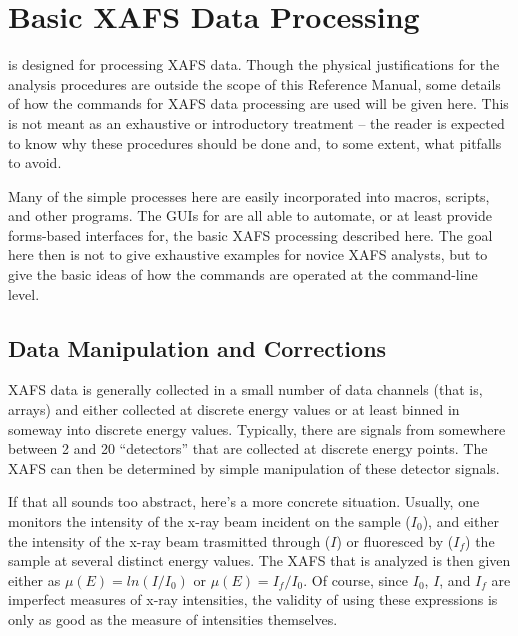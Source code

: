 \section{Basic XAFS Data Processing} \label{Ch:XAFSProcess}

{\ifeffit} is designed for processing XAFS data.  Though the physical
justifications for the analysis procedures are outside the scope of this
Reference Manual, some details of how the commands for XAFS data processing
are used will be given here.  This is not meant as an exhaustive or
introductory treatment -- the reader is expected to know why these
procedures should be done and, to some extent, what pitfalls to avoid.

Many of the simple processes here are easily incorporated into macros,
scripts, and other programs.  The GUIs for {\ifeffit} are all able to
automate, or at least provide forms-based interfaces for, the basic XAFS
processing described here.  The goal here then is not to give exhaustive
examples for novice XAFS analysts, but to give the basic ideas of how the
commands are operated at the command-line level.

\subsection{Data Manipulation and Corrections} \label{Ch:XAFSProcess-manip}

XAFS data is generally collected in a small number of data channels (that
is, arrays) and either collected at discrete energy values or at least
binned in someway into discrete energy values.  Typically, there are
signals from somewhere between 2 and 20 ``detectors'' that are collected at
discrete energy points.  The XAFS {\muE} can then be determined by simple
manipulation of these detector signals.

If that all sounds too abstract, here's a more concrete situation. Usually,
one monitors the intensity of the x-ray beam incident on the sample
($I_0$), and either the intensity of the x-ray beam trasmitted through
($I$) or fluoresced by ($I_f$) the sample at several distinct energy
values.  The XAFS {\muE} that is analyzed is then given either as $ \mu(E)
= ln(I/I_0)$ or $ \mu(E) = I_f/I_0 $.  Of course, since $I_0$, $I$, and
$I_f$ are imperfect measures of x-ray intensities, the validity of using
these expressions is only as good as the measure of intensities themselves.

